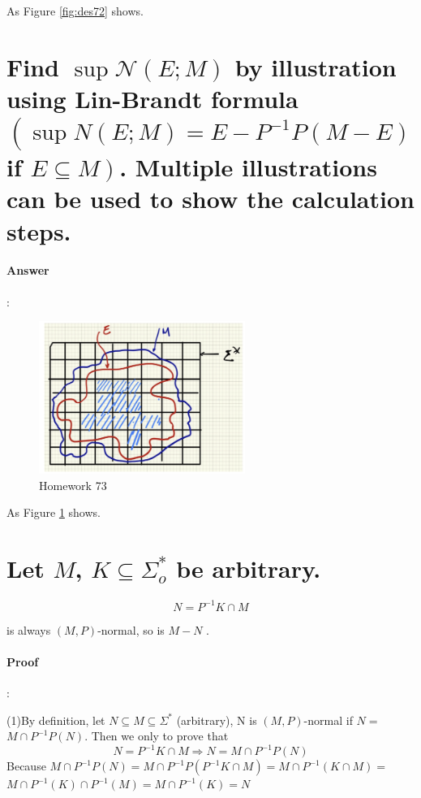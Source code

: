 \documentclass{article}
\begin{document}
As Figure \ref{fig:des72} shows.

\section{Find $\sup \mathcal{N}(E ; M)$ by illustration using Lin-Brandt formula $\left(\sup N(E ; M)=E-P^{-1} P(M-E)\right.$ if $\left.E \subseteq M\right)$. Multiple illustrations can be used to show the calculation steps.}

\paragraph{Answer}:

\begin{figure}[h!]
  \centering
  \includegraphics[width=0.6\textwidth]{assets/DES73.png}
  \caption{Homework 73}
  \label{fig:des73}
\end{figure}

As Figure \ref{fig:des73} shows.


\section{Let $M$, $K \subseteq \Sigma_o^*$ be arbitrary. }

$$
N = P^{-1} K \cap M
$$

is always $(M, P )$-normal, so is $M - N$ .

\paragraph{Proof}:

(1)By definition, let $N \subseteq M \subseteq \Sigma^*$ (arbitrary), $\mathrm{N}$ is $(M, P)$-normal if $N=$ $M \cap P^{-1} P(N)$. Then we only to prove that
$$
N=P^{-1} K \cap M \Longrightarrow N=M \cap P^{-1} P(N)
$$
Because $M \cap P^{-1} P(N)=M \cap P^{-1} P\left(P^{-1} K \cap M\right)=M \cap P^{-1}(K \cap M)=$ $M \cap P^{-1}(K) \cap P^{-1}(M)=M \cap P^{-1}(K)=N$
\end{document}

